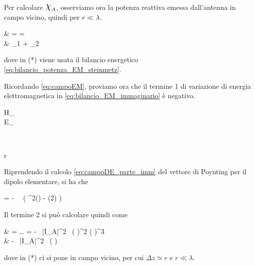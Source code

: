 \bigbreak
Per calcolare $\Chi_A$, osserviamo ora la potenza reattiva emessa dall'antenna in campo vicino, quindi per $r \ll \lambda$.

\begin{esp} \label{eq:bilancio_EM_immaginario}
	\Im [P]
	& = \Im{}
	= \Im{} \\
	& \stackrel{(*)}{=}
	\omega {}_{1}
	+ _{2}
\end{esp}
dove in (*) viene usata il bilancio energetico \autoref{eq:bilancio_potenza_EM_steinmetz}.

Ricordando \autoref{eq:campoEM}, proviamo ora che il termine 1 di variazione di energia elettromagnetica in \autoref{eq:bilancio_EM_immaginario} è negativo.
\begin{esp*}
	\begin{dcases}
		H_\phi \propto {} \\
		E_\theta \propto {}
	\end{dcases}
	\implies
	\begin{dcases}
		 \simeq \frac{\mu}{r^2} \\
		 \simeq \frac{\mu}{r^6}
	\end{dcases}
	\implies {} \gg {}
	 r \ll \lambda
\end{esp*}

Riprendendo il calcolo \autoref{eq:campoDE_parte_imm} del vettore di Poynting per il dipolo elementare, si ha che
\begin{esp*}
	\Im[\P]
	= - 
	\,  \,
	\left(
		\sin^2(\theta) \hr
		- \sin(2\theta) \hth
	\right)
\end{esp*}

Il termine 2 si può calcolare quindi come
\begin{esp*}
	\Im{}
	& = \ldots
	= -  \, |I_A|^2 \,
	\left(  \right)^2
	\left(  \right)^3 \\
	& \stackrel{(*)}{\simeq} -  \, |I_A|^2 \,
	\left(  \right)
	 
\end{esp*}
dove in (*) ci si pone in campo vicino, per cui $\Delta z \simeq r$ e $r \ll \lambda$.

